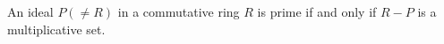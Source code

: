 An ideal $P (\neq R)$ in a commutative ring $R$ is prime if and only if $R - P$ is a multiplicative set.
